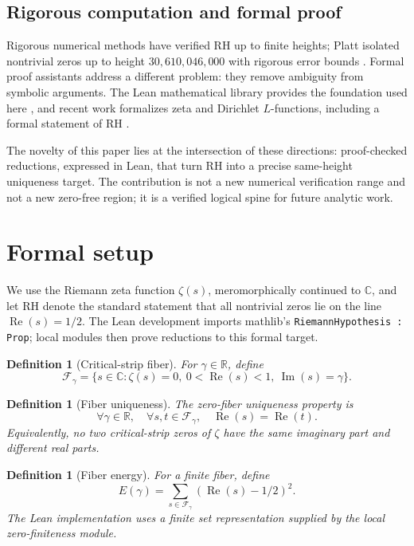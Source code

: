 \documentclass[11pt]{amsart}
\newtheorem{definition}[theorem]{Definition}
\newcommand{\C}{\mathbb{C}}
\newcommand{\R}{\mathbb{R}}
\newcommand{\zetaR}{\zeta}
\newcommand{\re}{\operatorname{Re}}
\newcommand{\im}{\operatorname{Im}}
\newcommand{\fiber}{\mathcal{F}}
\newcommand{\lean}[1]{\texttt{#1}}
\begin{document}
\subsection{Rigorous computation and formal proof}

Rigorous numerical methods have verified RH up to finite heights; Platt
isolated nontrivial zeros up to height \(30{,}610{,}046{,}000\) with rigorous
error bounds \cite{Platt2017}.  Formal proof assistants address a different
problem: they remove ambiguity from symbolic arguments.  The Lean mathematical
library provides the foundation used here \cite{Mathlib2020}, and recent work
formalizes zeta and Dirichlet \(L\)-functions, including a formal statement of
RH \cite{LoefflerStoll2025}.

The novelty of this paper lies at the intersection of these directions:
proof-checked reductions, expressed in Lean, that turn RH into a precise
same-height uniqueness target.  The contribution is not a new numerical
verification range and not a new zero-free region; it is a verified logical
spine for future analytic work.

\section{Formal setup}

We use the Riemann zeta function \(\zetaR(s)\), meromorphically continued to
\(\C\), and let RH denote the standard statement that all nontrivial zeros lie
on the line \(\re(s)=1/2\).  The Lean development imports mathlib's
\lean{RiemannHypothesis : Prop}; local modules then prove reductions to this
formal target.

\begin{definition}[Critical-strip fiber]
For \(\gamma\in\R\), define
\[
  \fiber_\gamma
    = \{s\in\C : \zetaR(s)=0,\ 0<\re(s)<1,\ \im(s)=\gamma\}.
\]
\end{definition}

\begin{definition}[Fiber uniqueness]
The zero-fiber uniqueness property is
\[
  \forall \gamma\in\R,\quad
  \forall s,t\in\fiber_\gamma,\quad \re(s)=\re(t).
\]
Equivalently, no two critical-strip zeros of \(\zetaR\) have the same imaginary
part and different real parts.
\end{definition}

\begin{definition}[Fiber energy]
For a finite fiber, define
\[
  E(\gamma)=\sum_{s\in\fiber_\gamma}(\re(s)-1/2)^2.
\]
The Lean implementation uses a finite set representation supplied by the local
zero-finiteness module.
\end{definition}
\end{document}
